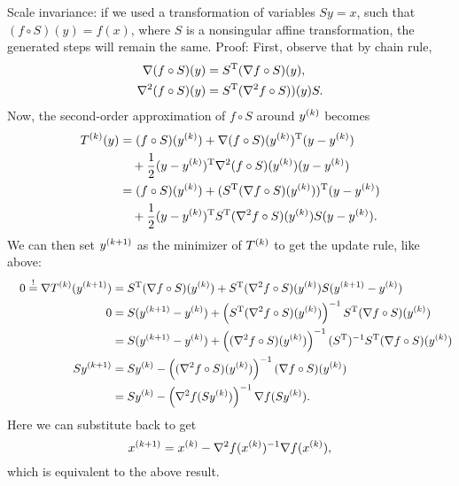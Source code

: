 \documentclass{article}
\begin{document}
Scale invariance: if we used a transformation of variables \(Sy = x\), such that
\((f \circ S)(y) = f(x)\), where \(S\) is a nonsingular affine transformation, the generated steps
will remain the same.  Proof: First, observe that by chain rule,
\begin{align*}
  \nabla (f \circ S)(y) &= \T{S}(\nabla f \circ S)(y), \\
  \nabla^2 (f \circ S)(y) &= \T{S}(\nabla^2 f \circ S))(y)S.
\end{align*}
Now, the second-order approximation of \(f \circ S\) around \(\kth{y}\) becomes
\begin{align*}
  \kth{T}(y) &= (f \circ S)(\kth{y}) + \T{\nabla (f \circ S)(\kth{y})}(y - \kth{y}) \\
             &\quad + \frac{1}{2} \T{(y - \kth{y})} \nabla^2 (f \circ S)(\kth{y}) (y - \kth{y}) \\
             &= (f \circ S)(\kth{y}) + \T{(\T{S}(\nabla f \circ S)(\kth{y}))}(y - \kth{y}) \\
             &\quad + \frac{1}{2} \T{(y - \kth{y})}
               \T{S}(\nabla^2 f \circ S)(\kth{y})S (y - \kth{y}).
\end{align*}
We can then set \(\kth[k+1]{y}\) as the minimizer of \(\kth{T}\) to get the update rule, like above:
\begin{align*}
  & & 0 \overset{!}{=} \nabla \kth{T}(\kth[k+1]{y}) &= \T{S}(\nabla f \circ S)(\kth{y})
                                                      + \T{S}(\nabla^2 f \circ S)(\kth{y})S
                                                      (\kth[k+1]{y} - \kth{y}) \\
  & & 0 &= S(\kth[k+1]{y} - \kth{y}) + \left( \T{S}(\nabla^2 f \circ S)(\kth{y}) \right)^{-1}
          \T{S}(\nabla f \circ S)(\kth{y}) \\
  & & &= S(\kth[k+1]{y} - \kth{y}) + \left( (\nabla^2 f \circ S)(\kth{y}) \right)^{-1} (\T{S})^{-1}
          \T{S}(\nabla f \circ S)(\kth{y}) \\
  & & S\kth[k+1]{y} &= S\kth{y} - \left( (\nabla^2 f \circ S)(\kth{y}) \right)^{-1}
                      (\nabla f \circ S)(\kth{y}) \\
  & & &= S\kth{y} - \left( \nabla^2 f(S\kth{y}) \right)^{-1}
                      \nabla f(S\kth{y}).
\end{align*}
Here we can substitute back to get
\begin{equation*}
  \kth[k+1]{x} = \kth{x} - \nabla^2 f(\kth{x})^{-1} \nabla f(\kth{x}),
\end{equation*}
which is equivalent to the above result.
\end{document}
